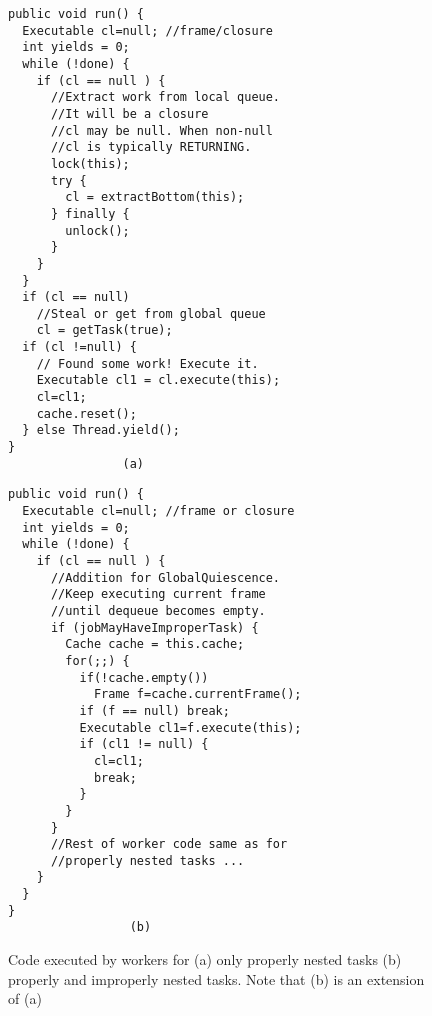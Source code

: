 \begin{figure*}
\begin{minipage}{0.5\textwidth}
\scriptsize
\begin{verbatim}
public void run() {
  Executable cl=null; //frame/closure
  int yields = 0;
  while (!done) {
    if (cl == null ) {
      //Extract work from local queue.
      //It will be a closure
      //cl may be null. When non-null
      //cl is typically RETURNING.
      lock(this);
      try {
        cl = extractBottom(this);
      } finally {
        unlock();
      }
    }
  }
  if (cl == null)
    //Steal or get from global queue
    cl = getTask(true);  
  if (cl !=null) {
    // Found some work! Execute it.
    Executable cl1 = cl.execute(this);
    cl=cl1;
    cache.reset();
  } else Thread.yield();
}
                (a)
\end{verbatim}
\end{minipage}%
\begin{minipage}{0.5\textwidth}
\scriptsize
\begin{verbatim}
public void run() {
  Executable cl=null; //frame or closure
  int yields = 0;
  while (!done) {
    if (cl == null ) {
      //Addition for GlobalQuiescence. 
      //Keep executing current frame 
      //until dequeue becomes empty.
      if (jobMayHaveImproperTask) {
        Cache cache = this.cache;
        for(;;) {
          if(!cache.empty())
            Frame f=cache.currentFrame();
          if (f == null) break;
          Executable cl1=f.execute(this);
          if (cl1 != null) {
            cl=cl1;
            break;
          }
        }
      } 
      //Rest of worker code same as for
      //properly nested tasks ...
    }
  }
}
                 (b)
\end{verbatim}
\end{minipage}
\caption{Code executed by workers for (a) only properly nested tasks (b)
  properly and improperly nested tasks. Note that (b) is an extension of (a)}
\label{fig:worker-code}
\end{figure*}


